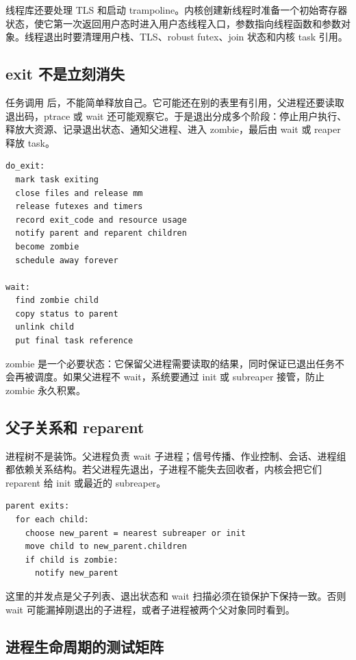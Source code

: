 线程库还要处理 TLS 和启动 trampoline。内核创建新线程时准备一个初始寄存器状态，使它第一次返回用户态时进入用户态线程入口，参数指向线程函数和参数对象。线程退出时要清理用户栈、TLS、robust futex、join 状态和内核 task 引用。

\subsection{exit 不是立刻消失}

任务调用  后，不能简单释放自己。它可能还在别的表里有引用，父进程还要读取退出码，ptrace 或 wait 还可能观察它。于是退出分成多个阶段：停止用户执行、释放大资源、记录退出状态、通知父进程、进入 zombie，最后由 wait 或 reaper 释放 task。

\begin{lstlisting}
do_exit:
  mark task exiting
  close files and release mm
  release futexes and timers
  record exit_code and resource usage
  notify parent and reparent children
  become zombie
  schedule away forever

wait:
  find zombie child
  copy status to parent
  unlink child
  put final task reference
\end{lstlisting}

zombie 是一个必要状态：它保留父进程需要读取的结果，同时保证已退出任务不会再被调度。如果父进程不 wait，系统要通过 init 或 subreaper 接管，防止 zombie 永久积累。

\subsection{父子关系和 reparent}

进程树不是装饰。父进程负责 wait 子进程；信号传播、作业控制、会话、进程组都依赖关系结构。若父进程先退出，子进程不能失去回收者，内核会把它们 reparent 给 init 或最近的 subreaper。

\begin{lstlisting}
parent exits:
  for each child:
    choose new_parent = nearest subreaper or init
    move child to new_parent.children
    if child is zombie:
      notify new_parent
\end{lstlisting}

这里的并发点是父子列表、退出状态和 wait 扫描必须在锁保护下保持一致。否则 wait 可能漏掉刚退出的子进程，或者子进程被两个父对象同时看到。

\subsection{进程生命周期的测试矩阵}

